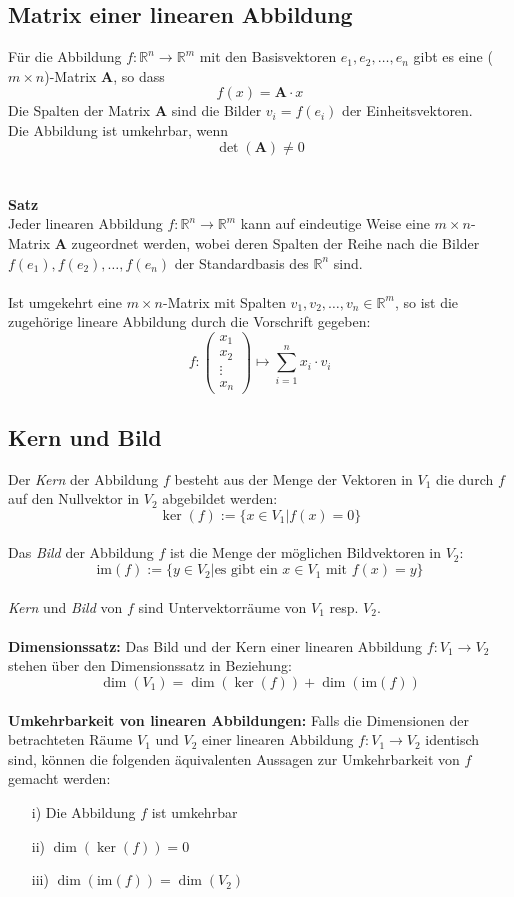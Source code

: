 \subsection{Matrix einer linearen Abbildung}
Für die Abbildung $f:\mathds{R}^n \rightarrow \mathds{R}^m$ mit den Basisvektoren
$e_1,e_2,\ldots,e_n$ gibt es eine ($m\times n$)-Matrix \textbf{A}, so dass
\[ f(x) = \textbf{A} \cdot x \]
Die Spalten der Matrix \textbf{A} sind die Bilder $v_i = f(e_i)$ der Einheitsvektoren.
\\
Die Abbildung ist umkehrbar, wenn
\[ \det(\textbf{A}) \neq 0 \]
\\\\
\textbf{Satz}\\
Jeder linearen Abbildung $f:\mathds{R}^n \rightarrow\mathds{R}^m$ kann auf eindeutige Weise
eine $m\times n$-Matrix \textbf{A} zugeordnet werden, wobei deren Spalten der Reihe nach die
Bilder $f(e_1),f(e_2),\ldots,f(e_n)$ der Standardbasis des $\mathds{R}^n$ sind.\\
\\
Ist umgekehrt eine $m\times n$-Matrix mit Spalten $v_1,v_2,\ldots,v_n\in\mathds{R}^m$,
so ist die zugehörige lineare Abbildung durch die Vorschrift gegeben:
\[ f: \begin{pmatrix} 	x_1 \\ x_2 \\ \vdots \\ x_n \end{pmatrix} \longmapsto 
	\sum_{i=1}^{n}x_i\cdot v_i \]
	
\subsection{Kern und Bild}
Der \textit{Kern} der Abbildung $f$ besteht aus der Menge der Vektoren in $V_1$ die durch
$f$ auf den Nullvektor in $V_2$ abgebildet werden:
\[ \ker(f) := \lbrace x\in V_1|f(x)=0 \rbrace \]
~\\
Das \textit{Bild} der Abbildung $f$ ist die Menge der möglichen Bildvektoren in $V_2$:
\[ \text{im}(f) := \lbrace y \in V_2|\text{es gibt ein }x\in V_1 \text{ mit } f(x)=y \rbrace \]
~\\
\textit{Kern} und \textit{Bild} von $f$ sind Untervektorräume von $V_1$ resp. $V_2$.
\\\\
\textbf{Dimensionssatz:} Das Bild und der Kern einer linearen Abbildung $f:V_1 \rightarrow V_2$
stehen über den Dimensionssatz in Beziehung:
\[ \dim(V_1) = \dim(\ker(f)) + \dim(\text{im}(f)) \]
~\\
\textbf{Umkehrbarkeit von linearen Abbildungen:} Falls die Dimensionen der betrachteten
Räume $V_1$ und $V_2$ einer linearen Abbildung $f:V_1 \rightarrow V_2$ identisch sind,
können die folgenden äquivalenten Aussagen zur Umkehrbarkeit von $f$ gemacht werden:
\begin{enumerate}
	\item[i)] Die Abbildung $f$ ist umkehrbar
	\item[ii)] $\dim(\ker(f))=0$
	\item[iii)] $\dim(\text{im}(f)) = \dim(V_2)$
\end{enumerate}

